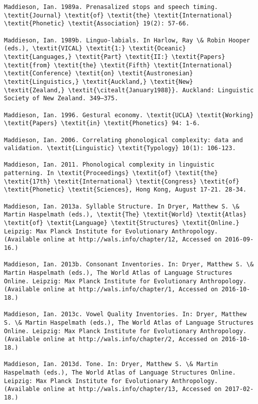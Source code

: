 \begin{verbatim}
Maddieson, Ian. 1989a. Prenasalized stops and speech timing. \textit{Journal} \textit{of} \textit{the} \textit{International} \textit{Phonetic} \textit{Association} 19(2): 57-66.

Maddieson, Ian. 1989b. Linguo-labials. In Harlow, Ray \& Robin Hooper (eds.), \textit{VICAL} \textit{1:} \textit{Oceanic} \textit{Languages,} \textit{Part} \textit{II:} \textit{Papers} \textit{from} \textit{the} \textit{Fifth} \textit{International} \textit{Conference} \textit{on} \textit{Austronesian} \textit{Linguistics,} \textit{Auckland,} \textit{New} \textit{Zealand,} \textit{\citealt{January1988}}. Auckland: Linguistic Society of New Zealand. 349–375.

Maddieson, Ian. 1996. Gestural economy. \textit{UCLA} \textit{Working} \textit{Papers} \textit{in} \textit{Phonetics} 94: 1-6.

Maddieson, Ian. 2006. Correlating phonological complexity: data and validation. \textit{Linguistic} \textit{Typology} 10(1): 106-123.

Maddieson, Ian. 2011. Phonological complexity in linguistic patterning. In \textit{Proceedings} \textit{of} \textit{the} \textit{17th} \textit{International} \textit{Congress} \textit{of} \textit{Phonetic} \textit{Sciences}, Hong Kong, August 17-21. 28-34.

Maddieson, Ian. 2013a. Syllable Structure. In Dryer, Matthew S. \& Martin Haspelmath (eds.), \textit{The} \textit{World} \textit{Atlas} \textit{of} \textit{Language} \textit{Structures} \textit{Online.} Leipzig: Max Planck Institute for Evolutionary Anthropology. (Available online at http://wals.info/chapter/12, Accessed on 2016-09-16.)

Maddieson, Ian. 2013b. Consonant Inventories. In: Dryer, Matthew S. \& Martin Haspelmath (eds.), The World Atlas of Language Structures Online. Leipzig: Max Planck Institute for Evolutionary Anthropology. (Available online at http://wals.info/chapter/1, Accessed on 2016-10-18.) 

Maddieson, Ian. 2013c. Vowel Quality Inventories. In: Dryer, Matthew S. \& Martin Haspelmath (eds.), The World Atlas of Language Structures Online. Leipzig: Max Planck Institute for Evolutionary Anthropology. (Available online at http://wals.info/chapter/2, Accessed on 2016-10-18.)

Maddieson, Ian. 2013d. Tone. In: Dryer, Matthew S. \& Martin Haspelmath (eds.), The World Atlas of Language Structures Online. Leipzig: Max Planck Institute for Evolutionary Anthropology. (Available online at http://wals.info/chapter/13, Accessed on 2017-02-18.)


\end{verbatim}
